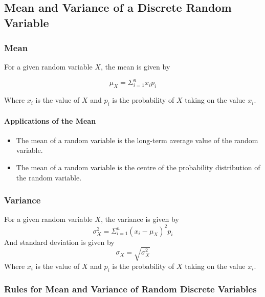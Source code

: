\documentclass[12pt letter]{report}
\begin{document}
\subsection{Mean and Variance of a Discrete Random Variable}

\subsubsection{Mean}


For a given random variable $X$, the mean is given by

\[
	\mu_{X} = \Sigma_{i=1}^{n} x_i p_i
\]

Where $x_i$ is the value of $X$ and $p_i$ is the probability of $X$ taking on the value $x_i$.


\paragraph{Applications of the Mean}

\begin{itemize}
	\item The mean of a random variable is the long-term average value of the random variable.
	\item The mean of a random variable is the centre of the probability distribution of the random variable.
\end{itemize}

\subsubsection{Variance}


For a given random variable $X$, the variance is given by
\[
	\sigma_{X}^2 = \Sigma_{i=1}^{n} \left( x_i - \mu_{X} \right)^2 p_i
\]
And standard deviation is given by
\[
	\sigma_{X} = \sqrt{\sigma_{X} ^2}
\]
Where $x_i$ is the value of $X$ and $p_i$ is the probability of $X$ taking on the value $x_i$.


\subsubsection{Rules for Mean and Variance of Random Discrete Variables}
\end{document}
